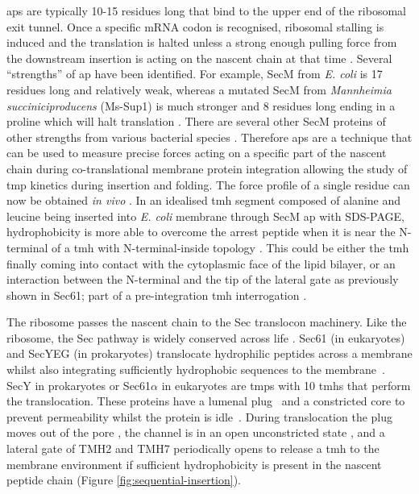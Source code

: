 \gls{ap}s are typically 10-15 residues long that bind to the upper end of the ribosomal exit tunnel.
Once a specific mRNA codon is recognised, ribosomal stalling is induced \cite{Ito2010} and the translation is halted unless a strong enough pulling force from the downstream insertion is acting on the nascent chain at that time \cite{Butkus2003}.
Several ``strengths'' of \gls{ap} have been identified.
For example, SecM from \textit{E. coli} is 17 residues long and relatively weak, whereas a mutated SecM from \textit{Mannheimia succiniciproducens} (Ms-Sup1) is much stronger and 8 residues long ending in a proline which will halt translation \cite{Ismail2012}.
There are several other SecM proteins of other strengths from various bacterial species \cite{Yap2009}.
Therefore \gls{ap}s are a technique that can be used to measure precise forces acting on a specific part of the nascent chain during co-translational membrane protein integration allowing the study of \gls{tmp} kinetics during insertion and folding.
The force profile of a single residue can now be obtained \textit{in vivo} \cite{Ismail2012}.
In an idealised \gls{tmh} segment composed of alanine and leucine being inserted into \textit{E. coli} membrane through SecM \gls{ap} with SDS-PAGE, hydrophobicity is more able to overcome the arrest peptide when it is near the N\--terminal of a \gls{tmh} with N\--terminal-inside topology \cite{Ismail2012}.
This could be either the \gls{tmh} finally coming into contact with the cytoplasmic face of the lipid bilayer, or an interaction between the N\--terminal and the tip of the lateral gate as previously shown in Sec61; part of a pre-integration \gls{tmh} interrogation \cite{MacKinnon2014}.

The ribosome passes the nascent chain to the Sec translocon machinery.
Like the ribosome, the Sec pathway is widely conserved across life \cite{Cao2003}.
Sec61 (in eukaryotes) and SecYEG (in prokaryotes) translocate hydrophilic peptides across a membrane whilst also integrating sufficiently hydrophobic sequences to the membrane~\cite{Junne2010, Park2012, Shao2011, Cymer2015}.
SecY in prokaryotes or Sec61$\alpha$ in eukaryotes are \gls{tmp}s with 10 \gls{tmh}s that perform the translocation.
These proteins have a lumenal plug~\cite{Tam2005, Junne2006} and a constricted core to prevent permeability whilst the protein is idle~\cite{Junne2010}.
During translocation the plug moves out of the pore \cite{Li2016}, the channel is in an open unconstricted state \cite{Junne2010}, and a lateral gate of TMH2 and TMH7 \cite{VandenBerg2004} periodically opens to release a \gls{tmh} to the membrane environment if sufficient hydrophobicity is present in the nascent peptide chain \cite{Niesen2018, Junne2010, Egea2010}(Figure \ref{fig:sequential-insertion}).


